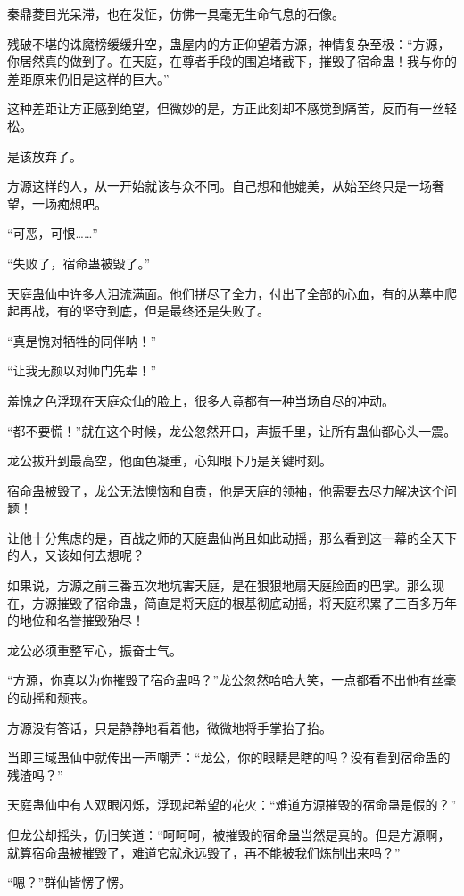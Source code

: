 \begin{this_body}
秦鼎菱目光呆滞，也在发怔，仿佛一具毫无生命气息的石像。

残破不堪的诛魔榜缓缓升空，蛊屋内的方正仰望着方源，神情复杂至极：“方源，你居然真的做到了。在天庭，在尊者手段的围追堵截下，摧毁了宿命蛊！我与你的差距原来仍旧是这样的巨大。”

这种差距让方正感到绝望，但微妙的是，方正此刻却不感觉到痛苦，反而有一丝轻松。

是该放弃了。

方源这样的人，从一开始就该与众不同。自己想和他媲美，从始至终只是一场奢望，一场痴想吧。

“可恶，可恨……”

“失败了，宿命蛊被毁了。”

天庭蛊仙中许多人泪流满面。他们拼尽了全力，付出了全部的心血，有的从墓中爬起再战，有的坚守到底，但是最终还是失败了。

“真是愧对牺牲的同伴呐！”

“让我无颜以对师门先辈！”

羞愧之色浮现在天庭众仙的脸上，很多人竟都有一种当场自尽的冲动。

“都不要慌！”就在这个时候，龙公忽然开口，声振千里，让所有蛊仙都心头一震。

龙公拔升到最高空，他面色凝重，心知眼下乃是关键时刻。

宿命蛊被毁了，龙公无法懊恼和自责，他是天庭的领袖，他需要去尽力解决这个问题！

让他十分焦虑的是，百战之师的天庭蛊仙尚且如此动摇，那么看到这一幕的全天下的人，又该如何去想呢？

如果说，方源之前三番五次地坑害天庭，是在狠狠地扇天庭脸面的巴掌。那么现在，方源摧毁了宿命蛊，简直是将天庭的根基彻底动摇，将天庭积累了三百多万年的地位和名誉摧毁殆尽！

龙公必须重整军心，振奋士气。

“方源，你真以为你摧毁了宿命蛊吗？”龙公忽然哈哈大笑，一点都看不出他有丝毫的动摇和颓丧。

方源没有答话，只是静静地看着他，微微地将手掌抬了抬。

当即三域蛊仙中就传出一声嘲弄：“龙公，你的眼睛是瞎的吗？没有看到宿命蛊的残渣吗？”

天庭蛊仙中有人双眼闪烁，浮现起希望的花火：“难道方源摧毁的宿命蛊是假的？”

但龙公却摇头，仍旧笑道：“呵呵呵，被摧毁的宿命蛊当然是真的。但是方源啊，就算宿命蛊被摧毁了，难道它就永远毁了，再不能被我们炼制出来吗？”

“嗯？”群仙皆愣了愣。


\end{this_body}
